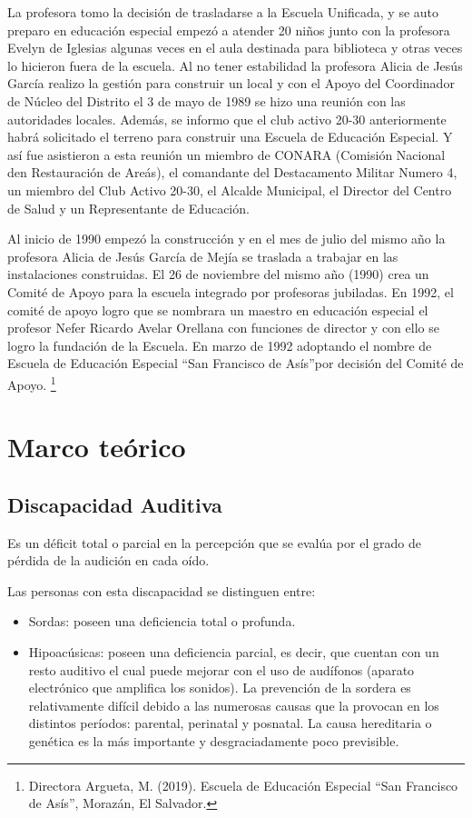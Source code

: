 \documentclass[12pt]{report}%
\begin{document}
La profesora tomo la decisión de trasladarse a la Escuela Unificada, y se auto preparo en educación especial empezó a atender 20 niños junto con la profesora Evelyn de Iglesias algunas veces en el aula destinada para biblioteca y otras veces lo hicieron fuera de la escuela. 
Al no tener estabilidad la profesora Alicia de Jesús García realizo la gestión para construir un local y con el Apoyo del Coordinador de Núcleo del Distrito el 3 de mayo de 1989 se hizo una reunión con las autoridades locales. Además, se informo que el club activo 20-30 anteriormente habrá solicitado el terreno para construir una Escuela de Educación Especial. Y así fue asistieron a esta reunión un miembro de CONARA (Comisión Nacional den Restauración de Areás), el comandante del Destacamento Militar Numero 4, un miembro del Club Activo 20-30, el Alcalde Municipal, el Director del Centro de Salud y un Representante de Educación. 

Al inicio de 1990 empezó la construcción y en el mes de julio del mismo año la profesora Alicia de Jesús García de Mejía se traslada a trabajar en las instalaciones construidas. El 26 de noviembre del mismo año (1990) crea un Comité de Apoyo para la escuela integrado por profesoras jubiladas. En 1992, el comité de apoyo logro que se nombrara un maestro en educación especial el profesor Nefer Ricardo Avelar Orellana con funciones de director y con ello se logro la fundación de la Escuela. 
En marzo de 1992 adoptando el nombre de Escuela de Educación Especial “San Francisco de Asís”por decisión del Comité de Apoyo. \footnote{Directora Argueta, M. (2019). Escuela de Educación Especial “San Francisco de Asís”, Morazán, El Salvador.}
\newpage
\section{Marco teórico}

\subsection{Discapacidad Auditiva}
Es un déficit total o parcial en la percepción que se evalúa por el grado de pérdida de la audición en cada oído.

Las personas con esta discapacidad se distinguen entre:
\begin{itemize}
\item Sordas: poseen una deficiencia total o profunda.
\item Hipoacúsicas: poseen una deficiencia parcial, es decir, que cuentan con un resto auditivo el cual puede mejorar con el uso de audífonos (aparato electrónico que amplifica los sonidos).
La prevención de la sordera es relativamente difícil debido a las numerosas causas que la provocan en los distintos períodos: parental, perinatal y posnatal. La causa hereditaria o genética es la más importante y desgraciadamente poco previsible.
\end{itemize}
\end{document}
